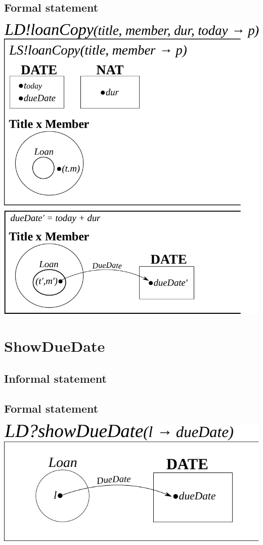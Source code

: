 \documentclass[]{article}
\begin{document}
\subsection{Formal statement}
\begin{center}
	\includegraphics[scale=0.75]{loan_copy.pdf}
\end{center}

\section{ShowDueDate}
\subsection{Informal statement}
\subsection{Formal statement}
\begin{center}
	\includegraphics[scale=0.75]{show_due_date.pdf}
\end{center}
\end{document}
